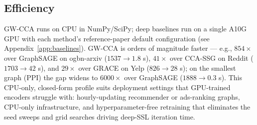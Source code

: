 \documentclass{article}
\begin{document}
\begin{table}[t]
\caption{Encoder training wall-clock (seconds; mean $\pm$ std over 5 seeds for deep baselines, single value for deterministic methods). GW-CCA and CCA$^\ast$ run on CPU (no GPU); deep baselines run on a single A10G GPU.}
\label{tab:efficiency}
\centering
{}
\end{table}

\subsection{Efficiency}
GW-CCA runs on CPU in NumPy/SciPy; deep baselines run on a single A10G
GPU with each method's reference-paper default configuration (see
Appendix~\ref{app:baselines}). GW-CCA is
orders of magnitude faster --- e.g., $854\times$ over GraphSAGE on
ogbn-arxiv ($1537 \to 1.8$ s), $41\times$ over CCA-SSG on Reddit
($1703 \to 42$ s), and $29\times$ over GRACE on Yelp
($826 \to 28$ s); on the smallest graph (PPI) the gap widens to
$6000\times$ over GraphSAGE ($1888 \to 0.3$ s). This CPU-only,
closed-form profile suits deployment settings that GPU-trained encoders
struggle with: hourly-updating recommender or ads-ranking graphs,
CPU-only infrastructure, and hyperparameter-free retraining that
eliminates the seed sweeps and grid searches driving deep-SSL iteration
time.
\end{document}
